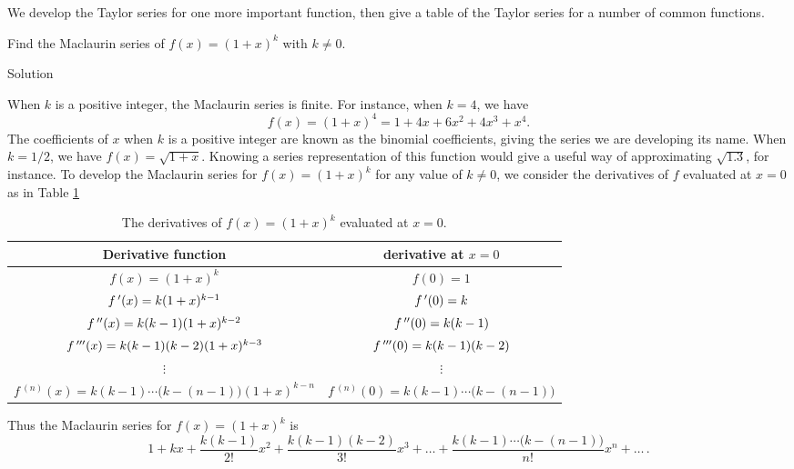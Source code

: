 We develop the Taylor series for one more important function, then give a table of the Taylor series for a number of common functions.

\begin{example}\label{ex_ts4}
Find the Maclaurin series of $f(x) = (1+x)^k$ with $k\neq 0$.

Solution 

When $k$ is a positive integer, the Maclaurin series is finite. For instance, when $k=4$, we have 
$$f(x) = (1+x)^4 = 1+4x+6x^2+4x^3+x^4.$$
The coefficients of $x$ when $k$ is a positive integer are known as the binomial coefficients, giving the series we are developing its name.
When $k=1/2$, we have $f(x) = \sqrt{1+x}$. Knowing a series representation of this function would give a useful way of approximating $\sqrt{1.3}$, for instance.
To develop the Maclaurin series for $f(x) = (1+x)^k$ for any value of $k\neq0$, we consider the derivatives of $f$ evaluated at $x=0$ as in Table \ref{tab_series_3}

\begin{table}[H]
\caption{The derivatives of $f(x) = (1+x)^k$ evaluated at $x=0$.}
\label{tab_series_3}
\renewcommand{\arraystretch}{1.5}
\begin{tabular}{c|c}
Derivative function&derivative at $x=0$\\\hline
$f(x) = (1+x)^k$ & $f(0) = 1$\\
$f\,'(x) = k(1+x)^{k-1} $&$ f\,'(0) =k$\\
$f\,''(x) = k(k-1)(1+x)^{k-2}$ & $f\,''(0) =k(k-1)$\\
$f\,'''(x) = k(k-1)(k-2)(1+x)^{k-3}$ & $f\,'''(0) =k(k-1)(k-2)$\\
$\vdots$ & $\vdots$\\
$f\,^{(n)}(x) = k(k-1)\cdots\big(k-(n-1)\big)(1+x)^{k-n}$ & $f\,^{(n)}(0) =k(k-1)\cdots\big(k-(n-1)\big)$\\\hline
\end{tabular}
\renewcommand{\arraystretch}{1}
\end{table}

Thus the Maclaurin series for $f(x) = (1+x)^k$ is
$$1+ kx + \frac{k(k-1)}{2!}x^2 + \frac{k(k-1)(k-2)}{3!}x^3 + \ldots + \frac{k(k-1)\cdots\big(k-(n-1)\big)}{n!}x^n+\ldots\,.$$


\end{example}
